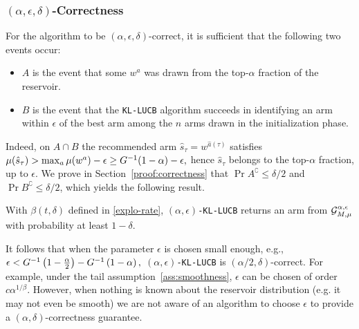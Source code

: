 %
%
\subsubsection{$(\alpha,\epsilon,\delta)$-Correctness}\label{sec-correctness}

For the algorithm to be $(\alpha,\epsilon,\delta)$-correct, it is sufficient that the following two events occur: 
\begin{itemize}[nosep]
    \item $A$ is the event that some $w^a$ was drawn from the
         top-$\alpha$ fraction of the reservoir.
    \item $B$ is the event that the \texttt{KL-LUCB} algorithm succeeds in 
identifying an arm within $\epsilon$ of the best arm among the $n$ arms drawn in the initialization
phase.
\end{itemize}
%
Indeed, on $A\cap B$ the recommended arm $\hat{s}_\tau = w^{\hat{a}(\tau)}$ satisfies 
$
\mu(\hat{s}_\tau)  >  \max_{a} \mu(w^a) - \epsilon  \geq  G^{-1}(1-\alpha) - \epsilon, 
$
hence $\hat{s}_\tau$ belongs to the top-$\alpha$ fraction, up to $\epsilon$. We prove in
Section~\ref{proof:correctness}
that $\Pr{A^\complement} \leq \delta/2$ and $\Pr{B^\complement}\leq \delta/2$,
which yields the following result. 
%
\vspace{-2pt}
%
\begin{lemma}\label{correctness}
With $\beta(t,\delta)$ defined in \eqref{explo-rate}, \texttt{$(\alpha,\epsilon)$-KL-LUCB} returns an arm from $\mathcal{G}_{M,\mu}^{\alpha,\epsilon}$
with probability at least $1-\delta$.
\end{lemma}
%
\vspace{-2pt}
%
It follows that when the parameter $\epsilon$ is chosen small
enough, e.g.,
$
\epsilon < G^{-1}\left(1 - \frac{\alpha}{2}\right) - G^{-1}\left(1 - {\alpha}\right),
$
\texttt{$(\alpha,\epsilon)$-KL-LUCB} is $(\alpha/2,\delta)$-correct.
For example, under the tail assumption~\ref{ass:smoothness}, $\epsilon$ can be 
chosen of order $c\alpha^{1/\beta}$.
However, when nothing is known about the reservoir distribution (e.g. it may
not even be smooth) we are not aware of an algorithm to choose $\epsilon$
to provide a $(\alpha,\delta)$-correctness guarantee.


